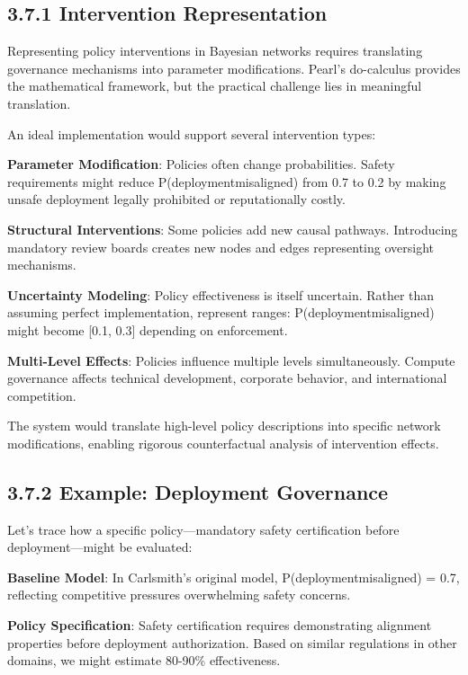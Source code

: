 \documentclass[
  11pt,
  letterpaper,
]{book}
\begin{document}
\subsection{3.7.1 Intervention
Representation}\label{sec-intervention-representation}

Representing policy interventions in Bayesian networks requires
translating governance mechanisms into parameter modifications. Pearl's
do-calculus provides the mathematical framework, but the practical
challenge lies in meaningful translation.

An ideal implementation would support several intervention types:

\textbf{Parameter Modification}: Policies often change probabilities.
Safety requirements might reduce P(deployment\textbar misaligned) from
0.7 to 0.2 by making unsafe deployment legally prohibited or
reputationally costly.

\textbf{Structural Interventions}: Some policies add new causal
pathways. Introducing mandatory review boards creates new nodes and
edges representing oversight mechanisms.

\textbf{Uncertainty Modeling}: Policy effectiveness is itself uncertain.
Rather than assuming perfect implementation, represent ranges:
P(deployment\textbar misaligned) might become {[}0.1, 0.3{]} depending
on enforcement.

\textbf{Multi-Level Effects}: Policies influence multiple levels
simultaneously. Compute governance affects technical development,
corporate behavior, and international competition.

The system would translate high-level policy descriptions into specific
network modifications, enabling rigorous counterfactual analysis of
intervention effects.

\subsection{3.7.2 Example: Deployment
Governance}\label{sec-deployment-example}

Let's trace how a specific policy---mandatory safety certification
before deployment---might be evaluated:

\textbf{Baseline Model}: In Carlsmith's original model,
P(deployment\textbar misaligned) = 0.7, reflecting competitive pressures
overwhelming safety concerns.

\textbf{Policy Specification}: Safety certification requires
demonstrating alignment properties before deployment authorization.
Based on similar regulations in other domains, we might estimate 80-90\%
effectiveness.
\end{document}
